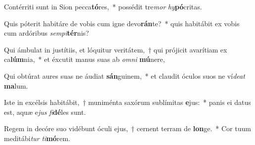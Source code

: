 \item Contérriti sunt in Sion pecca\textbf{tó}res,~* possédit tre\textit{mor} \textit{hy}\textbf{pó}critas.
\item Quis póterit habitáre de vobis cum igne devo\textbf{rán}te?~* quis habitábit ex vobis cum ardóribus \textit{sem}\textit{pi}\textbf{tér}nis?
\item Qui ámbulat in justítiis, et lóquitur veritátem,~† qui prójicit avarítiam ex ca\textbf{lúm}nia,~* et éxcutit manus suas ab \textit{om}\textit{ni} \textbf{mú}nere,
\item Qui obtúrat aures suas ne áudiat \textbf{sán}guinem,~* et claudit óculos suos ne ví\textit{de}\textit{at} \textbf{ma}lum.
\item Iste in excélsis habitábit,~† muniménta saxórum sublímitas \textbf{e}jus:~* panis ei datus est, aquæ e\textit{jus} \textit{fi}\textbf{dé}les sunt.
\item Regem in decóre suo vidébunt óculi ejus,~† cernent terram de \textbf{lon}ge.~* Cor tuum meditábi\textit{tur} \textit{ti}\textbf{mó}rem.
